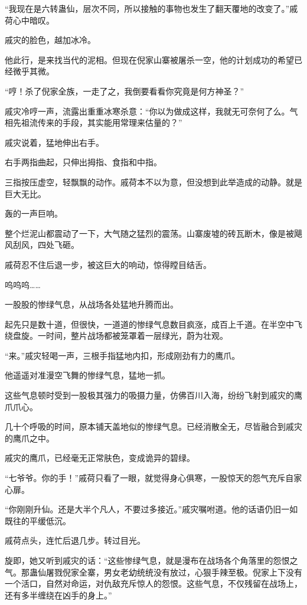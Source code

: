 \begin{this_body}
“我现在是六转蛊仙，层次不同，所以接触的事物也发生了翻天覆地的改变了。”戚荷心中暗叹。

戚灾的脸色，越加冰冷。

他此行，是来找当代的泥相。但现在倪家山寨被屠杀一空，他的计划成功的希望已经微乎其微。

“哼！杀了倪家全族，一走了之，我倒要看看你究竟是何方神圣？”

戚灾冷哼一声，流露出重重冰寒杀意：“你以为做成这样，我就无可奈何了么。气相先祖流传来的手段，其实能用常理来估量的？”

戚灾说着，猛地伸出右手。

右手两指曲起，只伸出拇指、食指和中指。

三指按压虚空，轻飘飘的动作。戚荷本不以为意，但没想到此举造成的动静。就是巨大无比。

轰的一声巨响。

整个烂泥山都震动了一下，大气随之猛烈的震荡。山寨废墟的砖瓦断木，像是被飓风刮风，四处飞砸。

戚荷忍不住后退一步，被这巨大的响动，惊得瞠目结舌。

呜呜呜……

一股股的惨绿气息，从战场各处猛地升腾而出。

起先只是数十道，但很快，一道道的惨绿气息数目疯涨，成百上千道。在半空中飞绕盘旋。一时间，整片战场都被笼罩着一层绿光，蔚为壮观。

“来。”戚灾轻喝一声，三根手指猛地内扣，形成刚劲有力的鹰爪。

他遥遥对准漫空飞舞的惨绿气息，猛地一抓。

这些气息顿时受到一股极其强力的吸摄力量，仿佛百川入海，纷纷飞射到戚灾的鹰爪爪心。

几十个呼吸的时间，原本铺天盖地似的惨绿气息。已经消散全无，尽皆融合到戚灾的鹰爪之中。

戚灾的鹰爪，已经毫无正常肤色，变成诡异的碧绿。

“七爷爷。你的手！”戚荷只看了一眼，就觉得身心俱寒，一股惊天的怨气充斥自家心扉。

“你刚刚升仙。还是大半个凡人，不要过多接近。”戚灾嘱咐道。他的话语仍旧一如既往的平缓低沉。

戚荷点头，连忙后退几步。转过目光。

旋即，她又听到戚灾的话：“这些惨绿气息，就是漫布在战场各个角落里的怨恨之气。那蛊仙屠戮倪家全寨，男女老幼统统没有放过，心狠手辣至极。倪家上下没有一个活口，自然对命运，对仇敌充斥惊人的怨恨。这些气息，不仅残留在战场上，还有多半缠绕在凶手的身上。”


\end{this_body}
